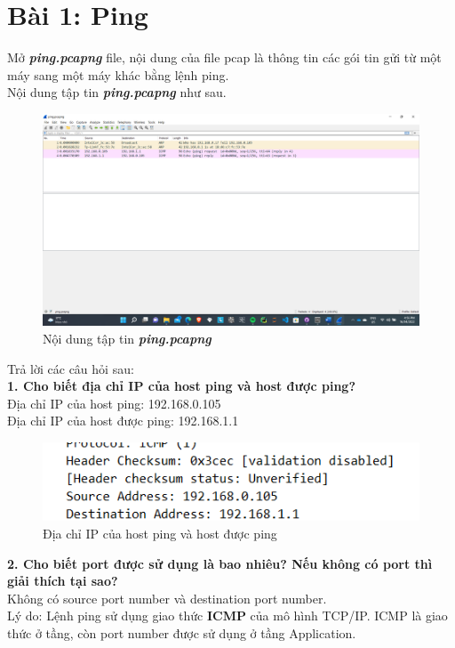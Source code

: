 \section{Bài 1: Ping}
Mở \textbf{\textit{ping.pcapng}} file, nội dung của file pcap là thông tin các gói tin gửi từ một máy sang một máy khác bằng lệnh ping.\\
Nội dung tập tin \textbf{\textit{ping.pcapng}} như sau.
\begin{figure}[H]
\begin{center}
\includegraphics[scale=0.45]{../figures/p1/p1_ping}
\end{center}
\caption{Nội dung tập tin \textbf{\textit{ping.pcapng}}}
\end{figure}
Trả lời các câu hỏi sau:\\
\textbf{1.	Cho biết địa chỉ IP của host ping và host được ping?}\\
Địa chỉ IP của host ping: 192.168.0.105\\
Địa chỉ IP của host được ping: 192.168.1.1
\begin{figure}[H]
\begin{center}
\includegraphics[scale=1]{../figures/p1/p1_r1}
\end{center}
\caption{Địa chỉ IP của host ping và host được ping}
\end{figure}

\textbf{2.	Cho biết port được sử dụng là bao nhiêu? Nếu không có port thì giải thích tại sao?}\\
Không có source port number và destination port number.\\
Lý do: Lệnh ping sử dụng giao thức \textbf{ICMP} của mô hình TCP/IP. ICMP là giao thức ở tầng, còn port number được sử dụng ở tầng Application.

